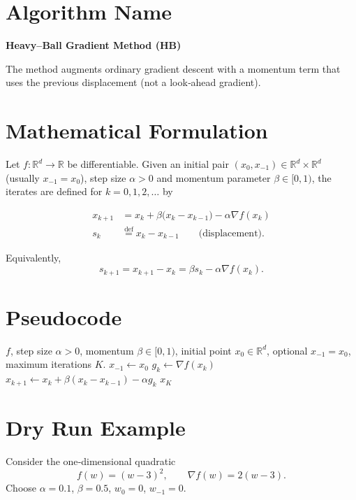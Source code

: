 \documentclass{article}
\newcommand{\R}{\mathbb{R}}
\begin{document}
\section*{Algorithm Name}
\textbf{Heavy–Ball Gradient Method (HB)}  

The method augments ordinary gradient descent with a momentum term that uses the previous displacement (not a look‑ahead gradient).

\section*{Mathematical Formulation}
Let $f:\R^{d}\rightarrow\R$ be differentiable.  
Given an initial pair $(x_{0},x_{-1})\in\R^{d}\times\R^{d}$ (usually $x_{-1}=x_{0}$), step size $\alpha>0$ and momentum parameter $\beta\in[0,1)$, the iterates are defined for $k=0,1,2,\dots$ by  

\[
\boxed{
\begin{aligned}
x_{k+1}&=x_{k}+\beta\bigl(x_{k}-x_{k-1}\bigr)-\alpha \nabla f(x_{k})   \tag{HB}\\
s_{k}&\stackrel{\text{def}}{=}x_{k}-x_{k-1}\qquad\text{(displacement)} .
\end{aligned}}
\]

Equivalently,
\[
s_{k+1}=x_{k+1}-x_{k}= \beta s_{k}-\alpha \nabla f(x_{k}). \tag{1}
\]

\section*{Pseudocode}
\begin{algorithm}[H]
\caption{Heavy–Ball Gradient Method}
\begin{algorithmic}[1]
\REQUIRE $f$, step size $\alpha>0$, momentum $\beta\in[0,1)$, 
initial point $x_{0}\in\R^{d}$, optional $x_{-1}=x_{0}$,
maximum iterations $K$.
\STATE $x_{-1}\gets x_{0}$
    \STATE $g_{k}\gets \nabla f(x_{k})$
    \STATE $x_{k+1}\gets x_{k}+ \beta (x_{k}-x_{k-1}) - \alpha g_{k}$   
\ENDFOR
\RETURN $x_{K}$
\end{algorithmic}
\end{algorithm}

\section*{Dry Run Example}
Consider the one‑dimensional quadratic  
\[
f(w)=(w-3)^{2},
\qquad \nabla f(w)=2(w-3).
\]
Choose $\alpha=0.1$, $\beta=0.5$, $w_{0}=0$, $w_{-1}=0$.
\end{document}
